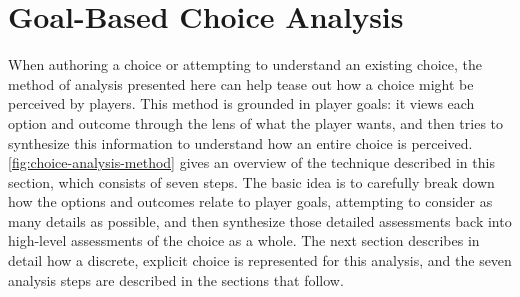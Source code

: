 \section{Goal-Based Choice Analysis}

\label{sec:goal-based-choice-analysis}

When authoring a choice or attempting to understand an existing choice, the method of analysis presented here can help tease out how a choice might be perceived by players.
%
This method is grounded in player goals: it views each option and outcome through the lens of what the player wants, and then tries to synthesize this information to understand how an entire choice is perceived.
%
\cref{fig:choice-analysis-method} gives an overview of the technique described in this section, which consists of seven steps.
%
The basic idea is to carefully break down how the options and outcomes relate to player goals, attempting to consider as many details as possible, and then synthesize those detailed assessments back into high-level assessments of the choice as a whole.
%
The next section describes in detail how a discrete, explicit choice is represented for this analysis, and the seven analysis steps are described in the sections that follow.



